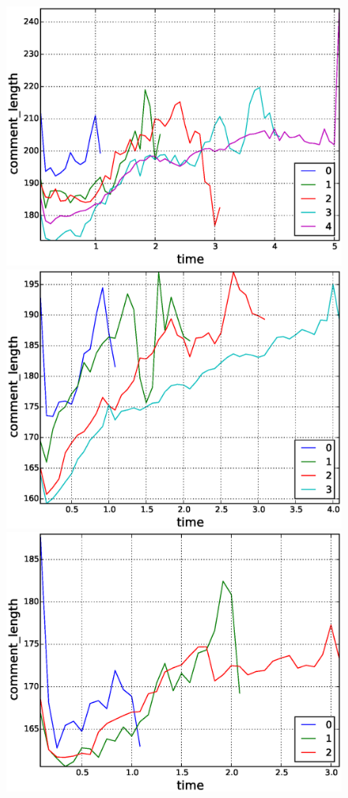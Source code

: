 \begin{figure}[!tb]
\includegraphics[scale=0.2]{./images/avr_comment_length_for_surviving_year_for_2010.eps}
\includegraphics[scale=0.2]{./images/avr_comment_length_for_surviving_year_for_2011.eps}
\includegraphics[scale=0.2]{./images/avr_comment_length_for_surviving_year_for_2012.eps}

\end{figure}
